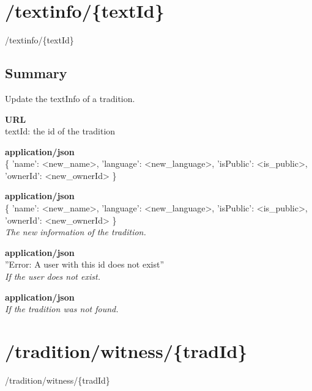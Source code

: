 \documentclass[11pt,fleqn,openany]{book} %
\begin{document}
\section{/textinfo/\{textId\}}
\begin{post}
/textinfo/\{textId\}
\end{post}

\subsection*{Summary}
Update the textInfo of a tradition.
\begin{parameter}\textbf{URL}\\
textId: the id of the tradition \\
\end{parameter}
\begin{parameter}
\textbf{application/json}\\
\{  'name': <new\_name>, 'language': <new\_language>, 'isPublic': <is\_public>, 'ownerId': <new\_ownerId>  \}
\end{parameter}
\begin{return}[SUCCESS]
\textbf{application/json}\\
\{  'name': <new\_name>, 'language': <new\_language>, 'isPublic': <is\_public>, 'ownerId': <new\_ownerId>  \}\\
\textit{The new information of the tradition.}
\end{return}
\begin{return}[CONFLICT]
\textbf{application/json}\\
''Error: A user with this id does not exist''\\
\textit{If the user does not exist. }
\end{return}
\begin{return}
\textbf{application/json}\\
\textit{If the tradition was not found. }
\end{return}

\section{/tradition/witness/\{tradId\}}
\begin{get}
/tradition/witness/\{tradId\}
\end{get}
\end{document}
